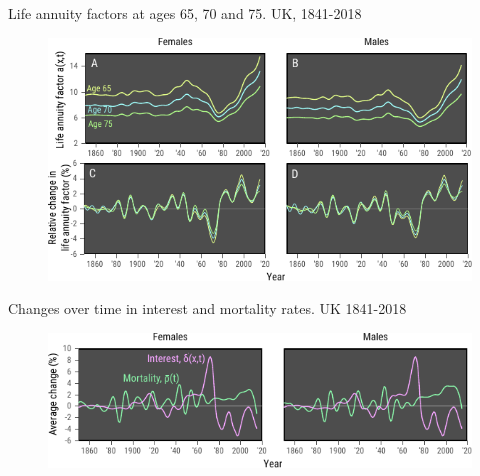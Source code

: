 \documentclass[10pt]{beamer}
\begin{document}
\begin{frame}{Life annuity factors at ages 65, 70 and 75. UK, 1841-2018}
\begin{figure}
	\centering
	\hspace*{-0.8cm}
	\includegraphics[scale=1.2] {Fig1.pdf}
\end{figure}
\end{frame}



\begin{frame}{Changes over time in interest and mortality rates. UK 1841-2018}
\begin{figure}
	\centering
	\hspace*{-0.8cm}
	\includegraphics[scale=1.2] {Fig2.pdf}
\end{figure}
\end{frame}
\end{document}
